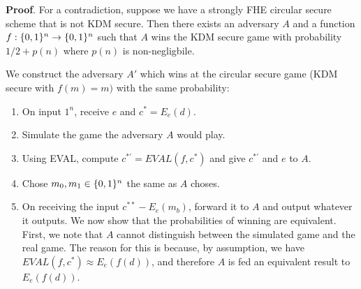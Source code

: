 \documentclass{article}
\begin{document}
\begin{enumerate}[,label=\alph*.]
\begin{mdbmarginx}{1ex}{0pt}{1ex}{0pt}%
\noindent{}\textbf{Proof}.  For a contradiction, suppose we have a strongly FHE circular secure scheme that is not KDM secure.
Then there exists an adversary $A$ and a function $f: \{0,1\}^n \to \{0,1\}^n$ such that $A$ wins the 
KDM secure game with probability $1/2 + p(n)$ where $p(n)$ is non-negligbile.%

We construct the adversary $A'$ which wins at the circular secure game (KDM secure with $f(m) = m)$
with the same probability:%

\begin{enumerate}[noitemsep,topsep=\mdcompacttopsep]%

\item{}On input $1^n$, receive $e$ and $c^* = E_e(d)$.%

\item{}Simulate the game the adversary $A$ would play.%

\item{}Using EVAL, compute $c^{*'} = EVAL(f,c^*)$ and give $c^{*'}$ and $e$ to $A$.%

\item{}Chose $m_0,m_1 \in \{0,1\}^n$ the same as $A$ choses.%

\item{}
On receiving the input $c^{**} - E_e(m_b)$, forward it to $A$ and output whatever it outputs.%
We now show that the probabilities of winning are equivalent. First, we note that $A$ cannot distinguish
between the simulated game and the real game. The reason for this is because, by assumption,
we have $EVAL(f,c^*) \approx E_e(f(d))$, and therefore $A$ is fed an equivalent result to $E_e(f(d))$.%
\end{enumerate}%


\end{mdbmarginx}
\end{enumerate}
\end{document}
